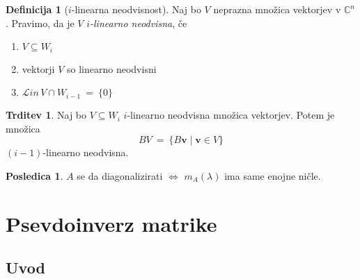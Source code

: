 \documentclass[11pt]{article}
\newcommand{\vv}{\mathbf{v}}
\newcommand{\0}{\mathbf{0}}
\newcommand{\Lin}{\mathcal{L}\textit{in}\,}
\theoremstyle{definition}
\newtheorem{definicija}{Definicija}[section]
\theoremstyle{definition}
\newtheorem{trditev}{Trditev}[section]
\theoremstyle{definition}
\theoremstyle{definition}
\newtheorem*{posledica}{Posledica}
\begin{document}
\begin{definicija}[$i$-linearna neodvisnost]

Naj bo $V$ neprazna množica vektorjev v $\mathbb{C}^n$. Pravimo, da je $V$ \textit{$i$-linearno neodvisna}, če
\begin{enumerate}
	\item $V \subseteq W_i$ 
	\item vektorji $V$ so linearno neodvisni
	\item $\Lin V \cap W_{i-1} ~=~ \{0\}$
\end{enumerate}

\end{definicija}
\vspace{0.5cm}

\begin{trditev}

Naj bo $V \subseteq W_i$ $i$-linearno neodvisna množica vektorjev. Potem je množica
$$BV ~=~ \{B\vv \mid \vv \in V\}$$
$(i-1)$-linearno neodvisna.

\end{trditev}
\vspace{0.5cm}

\begin{posledica}

$A$ se da diagonalizirati $\iff$ $m_A(\lambda)$ ima same enojne ničle.

\end{posledica}
\vspace{0.5cm}


\pagebreak


\section{Psevdoinverz matrike}
\vspace{0.5cm}


\subsection{Uvod}
\vspace{0.5cm}
\end{document}
